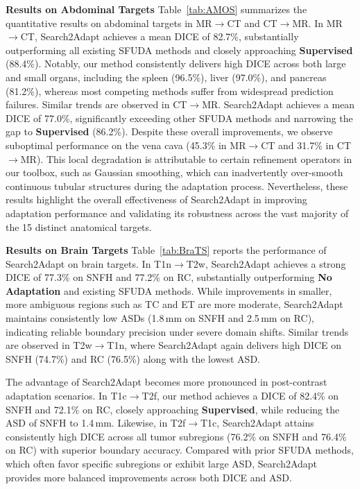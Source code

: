 \documentclass[sigconf, screen]{acmart}
\begin{document}
\textbf{Results on Abdominal Targets}
Table~\ref{tab:AMOS} summarizes the quantitative results on abdominal targets in MR$\rightarrow$CT and CT$\rightarrow$MR. In MR$\rightarrow$CT, Search2Adapt achieves a mean DICE of 82.7\%, substantially outperforming all existing SFUDA methods and closely approaching \textbf{Supervised} (88.4\%). Notably, our method consistently delivers high DICE across both large and small organs, including the spleen (96.5\%), liver (97.0\%), and pancreas (81.2\%), whereas most competing methods suffer from widespread prediction failures. Similar trends are observed in CT$\rightarrow$MR. Search2Adapt achieves a mean DICE of 77.0\%, significantly exceeding other SFUDA methods and narrowing the gap to \textbf{Supervised} (86.2\%). Despite these overall improvements, we observe suboptimal performance on the vena cava (45.3\% in MR$\rightarrow$CT and 31.7\% in CT$\rightarrow$MR). This local degradation is attributable to certain refinement operators in our toolbox, such as Gaussian smoothing, which can inadvertently over-smooth continuous tubular structures during the adaptation process. Nevertheless, these results highlight the overall effectiveness of Search2Adapt in improving adaptation performance and validating its robustness across the vast majority of the 15 distinct anatomical targets.

\textbf{Results on Brain Targets}
Table~\ref{tab:BraTS} reports the performance of Search2Adapt on brain targets. In T1n$\rightarrow$T2w, Search2Adapt achieves a strong DICE of 77.3\% on SNFH and 77.2\% on RC, substantially outperforming \textbf{No Adaptation} and existing SFUDA methods. While improvements in smaller, more ambiguous regions such as TC and ET are more moderate, Search2Adapt maintains consistently low ASDs (1.8\,mm on SNFH and 2.5\,mm on RC), indicating reliable boundary precision under severe domain shifts. Similar trends are observed in T2w$\rightarrow$T1n, where Search2Adapt again delivers high DICE on SNFH (74.7\%) and RC (76.5\%) along with the lowest ASD.

The advantage of Search2Adapt becomes more pronounced in post-contrast adaptation scenarios. In T1c$\rightarrow$T2f, our method achieves a DICE of 82.4\% on SNFH and 72.1\% on RC, closely approaching \textbf{Supervised}, while reducing the ASD of SNFH to 1.4\,mm. Likewise, in T2f$\rightarrow$T1c, Search2Adapt attains consistently high DICE across all tumor subregions (76.2\% on SNFH and 76.4\% on RC) with superior boundary accuracy. Compared with prior SFUDA methods, which often favor specific subregions or exhibit large ASD, Search2Adapt provides more balanced improvements across both DICE and ASD.
\end{document}
